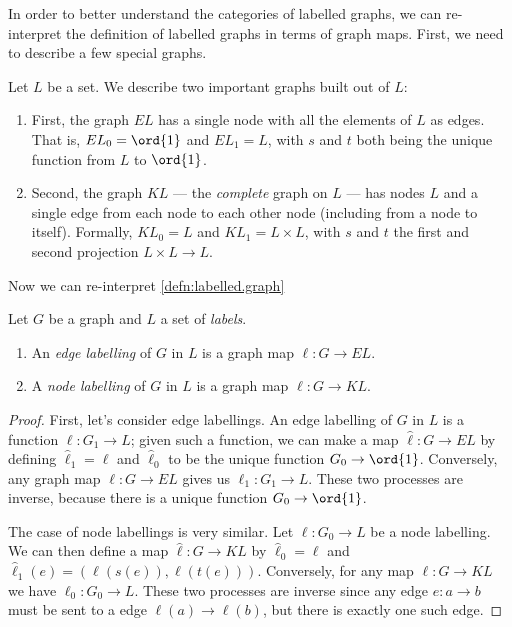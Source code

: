 \documentclass[DynamicalBook]{subfiles}
\begin{document}
In order to better understand the categories of labelled graphs, we can re-interpret the definition of labelled graphs in terms of graph maps. First, we need to describe a few special graphs.


\begin{definition}
Let $L$ be a set. We describe two important graphs built out of $L$:
\begin{enumerate}
        \item First, the graph $EL$ has a single node with all the elements of $L$ as edges. That is, $EL_{0} = \ord{1}$ and $EL_{1} = L$, with $s$ and $t$ both being the unique function from $L$  to $\ord{1}$.
        \item Second, the graph $KL$ --- the \emph{complete} graph on $L$ --- has nodes $L$ and a single edge from each node to each other node (including from a node to itself). Formally, $KL_{0} = L$ and $KL_{1} = L \times L$, with $s$ and $t$ the first and second projection $L \times L \to L$.
    \end{enumerate}
\end{definition}

Now we can re-interpret \cref{defn:labelled.graph}
\begin{proposition}
  Let $G$ be a graph and $L$ a set of \emph{labels}.
  \begin{enumerate}
\item An \emph{edge labelling} of $G$ in $L$ is a graph map $\ell : G \to EL$.
\item A \emph{node labelling} of $G$ in $L$ is a graph map $\ell : G \to KL$.
  \end{enumerate}
\end{proposition}
\begin{proof}
First, let's consider edge labellings. An edge labelling of $G$ in $L$ is a function $\ell : G_{1} \to L$; given such a function, we can make a map $\hat{\ell} : G \to EL$ by defining $\hat{\ell}_{1} = \ell$ and $\hat{\ell}_{0}$ to be the unique function $G_{0} \to \ord{1}$. Conversely, any graph map $\ell : G \to EL$ gives us $\ell_{1} : G_{1} \to L$. These two processes are inverse, because there is a unique function $G_{0} \to \ord{1}$.


The case of node labellings is very similar. Let $\ell : G_{0} \to L$ be a node labelling. We can then define a map $\hat{\ell} : G \to KL$ by $\hat{\ell}_{0} = \ell$ and $\hat{\ell}_{1}(e) = (\ell(s(e)), \ell(t(e)))$. Conversely, for any map $\ell : G \to KL$ we have $\ell_{0} : G_{0} \to L$. These two processes are inverse since any edge $e : a \to b$ must be sent to a edge $\ell(a) \to \ell(b)$, but there is exactly one such edge.
  \end{proof}
\end{document}
